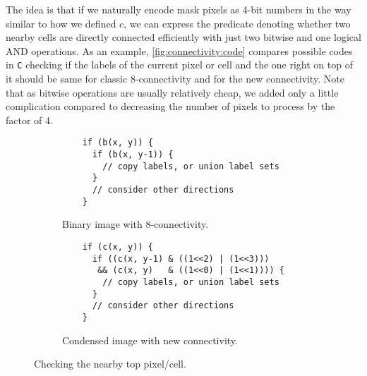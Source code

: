 \documentclass[hidelinks]{llncs}
\newcommand{\texten}[1]{#1}
\newcommand{\textru}[1]{}
\renewcommand{\C}{\texttt{C} \xspace}
\begin{document}
\texten{
The idea is that if we naturally encode mask pixels as 4-bit numbers in the
way similar to how we defined $c$, we can express the predicate denoting whether
two nearby cells
are directly connected efficiently with just two bitwise and one logical AND
operations.
As an example, \autoref{fig:connectivity:code} compares possible codes in \C checking
if the labels of the current pixel or cell and the one right on top of it
should be same for classic 8-connectivity and for the new connectivity.
Note that as bitwise operations are usually relatively cheap, we added only a
little complication compared to decreasing the number of pixels to process by the 
factor of 4.
}\textru{
Идея в том, что с нашим естественным способом кодирования конфигурации клеток в
4-разрядных числах, предикат, определяющий связность двух соседных клеток,
может быть представлен всего двумя битовыми и одной логической операцией И.
В качестве примера, на \autoref{fig:connectivity:code} приведено сравнение
возможных фрагментов программы на языке \C\hspace{-0.8em}, проверяющих, связан
ли текущий пиксель (или клетка) с пикселем (или клеткой) над ним (ней).
Стоит отметить, что хотя конструкция
усложнилась, битовые операции как правило очень эффективны, и это усложнение, скорее
всего, незначительно по сравнению с уменьшением количества рассматриваемых позиций в 4
раза.
}

\begin{figure}
  \centering
  \begin{subfigure}[t]{0.475\linewidth}
    \centering
    \begin{lstlisting}
    if (b(x, y)) {
      if (b(x, y-1)) {
        // copy labels, or union label sets
      }
      // consider other directions
    }
    \end{lstlisting}
    \caption{Binary image with 8-connectivity.}
  \end{subfigure}
  \quad
  \begin{subfigure}[t]{0.475\linewidth}
    \centering
    \begin{lstlisting}
    if (c(x, y)) {
      if ((c(x, y-1) & ((1<<2) | (1<<3)))
       && (c(x, y)   & ((1<<0) | (1<<1)))) {
        // copy labels, or union label sets
      }
      // consider other directions
    }
    \end{lstlisting}
    \caption{Condensed image with new connectivity.}
  \end{subfigure}
  \caption{Checking the nearby top pixel/cell.}
  \label{fig:connectivity:code}
\end{figure}
\end{document}
